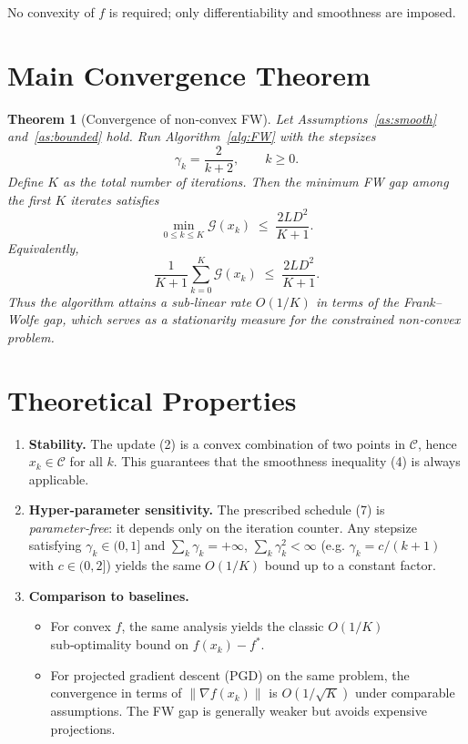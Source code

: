\documentclass{article}
\newtheorem{theorem}{Theorem}
\newcommand{\gap}{\mathcal{G}}
\begin{document}
No convexity of $f$ is required; only differentiability and smoothness are imposed.

\section*{Main Convergence Theorem}
\begin{theorem}[Convergence of non‑convex FW]\label{thm:main}
Let Assumptions~\ref{as:smooth} and~\ref{as:bounded} hold.  
Run Algorithm~\ref{alg:FW} with the stepsizes
\[
\gamma_{k}= \frac{2}{k+2},\qquad k\ge0 .
\tag{7}
\]
Define $K$ as the total number of iterations. Then the minimum FW gap among the first $K$ iterates satisfies
\[
\min_{0\le k\le K}\gap(x_{k})
\;\le\;
\frac{2L D^{2}}{K+1}.
\tag{8}
\]
Equivalently,
\[
\frac{1}{K+1}\sum_{k=0}^{K}\gap(x_{k})
\;\le\;
\frac{2L D^{2}}{K+1}.
\tag{9}
\]
Thus the algorithm attains a sub‑linear rate $O(1/K)$ in terms of the Frank–Wolfe gap, which serves as a stationarity measure for the constrained non‑convex problem.
\end{theorem}

\section*{Theoretical Properties}
\begin{enumerate}[leftmargin=*,label=\textbf{Property \arabic*.}]
\item \textbf{Stability.} The update (2) is a convex combination of two points in $\mathcal C$, hence $x_{k}\in\mathcal C$ for all $k$. This guarantees that the smoothness inequality (4) is always applicable.
\item \textbf{Hyper‑parameter sensitivity.} The prescribed schedule (7) is \emph{parameter‑free}: it depends only on the iteration counter. Any stepsize satisfying $\gamma_{k}\in(0,1]$ and $\sum_{k}\gamma_{k}=+\infty$, $\sum_{k}\gamma_{k}^{2}<\infty$ (e.g. $\gamma_{k}=c/(k+1)$ with $c\in(0,2]$) yields the same $O(1/K)$ bound up to a constant factor.
\item \textbf{Comparison to baselines.}
    \begin{itemize}
        \item For convex $f$, the same analysis yields the classic $O(1/K)$ sub‑optimality bound on $f(x_{k})-f^{*}$.
        \item For projected gradient descent (PGD) on the same problem, the convergence in terms of $\|\nabla f(x_{k})\|$ is $O(1/\sqrt{K})$ under comparable assumptions.  The FW gap is generally weaker but avoids expensive projections.
    \end{itemize}
\end{enumerate}
\end{document}

